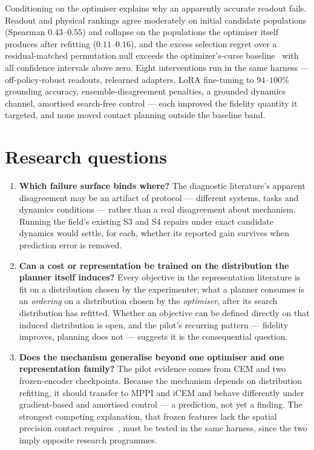 \documentclass[11pt,letterpaper]{article}
\begin{document}
Conditioning on the optimiser explains why an apparently accurate readout fails.
Readout and physical rankings agree moderately on initial candidate populations
(Spearman $0.43$--$0.55$) and collapse on the populations the optimiser itself
produces after refitting ($0.11$--$0.16$), and the excess selection regret over
a residual-matched permutation null exceeds the optimizer's-curse
baseline~\citep{smith2006optimizer} with all confidence intervals above zero.
Eight interventions run in the same harness --- off-policy-robust readouts,
relearned adapters, LoRA fine-tuning to $94$--$100\%$ grounding accuracy,
ensemble-disagreement penalties, a grounded dynamics channel, amortised
search-free control --- each improved the fidelity quantity it targeted, and
none moved contact planning outside the baseline band.

\section{Research questions}

\begin{enumerate}[label=\textbf{RQ\arabic*.},leftmargin=2.6em]
\item \textbf{Which failure surface binds where?} The diagnostic literature's
apparent disagreement may be an artifact of protocol --- different systems,
tasks and dynamics conditions --- rather than a real disagreement about
mechanism. Running the field's existing S3 and S4 repairs under exact candidate
dynamics would settle, for each, whether its reported gain survives when
prediction error is removed.
\item \textbf{Can a cost or representation be trained on the distribution the
planner itself induces?} Every objective in the representation literature is fit
on a distribution chosen by the experimenter; what a planner consumes is an
\emph{ordering} on a distribution chosen by the \emph{optimiser}, after its
search distribution has refitted. Whether an objective can be defined directly
on that induced distribution is open, and the pilot's recurring pattern ---
fidelity improves, planning does not --- suggests it is the consequential
question.
\item \textbf{Does the mechanism generalise beyond one optimiser and one
representation family?} The pilot evidence comes from CEM and two frozen-encoder
checkpoints. Because the mechanism depends on distribution refitting, it should
transfer to MPPI and iCEM and behave differently under gradient-based and
amortised control --- a prediction, not yet a finding. The strongest competing
explanation, that frozen features lack the spatial precision contact
requires~\citep{murlabadia2026vjepa21}, must be tested in the same harness,
since the two imply opposite research programmes.
\end{enumerate}
\end{document}
